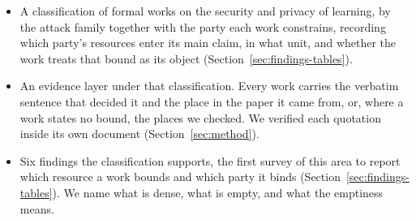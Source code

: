 \begin{itemize}
  \item A classification of \NumSources{} formal works on the security and
privacy of learning, by the attack family together with the party each work
constrains, recording which party's resources enter its main claim, in what
unit, and whether the work treats that bound as its object
(Section~\ref{sec:findings-tables}).
  \item An evidence layer under that classification. Every work carries the
verbatim sentence that decided it and the place in the paper it came from, or,
where a work states no bound, the places we checked. We verified each
quotation inside its own document (Section~\ref{sec:method}).
  \item Six findings the classification supports, the first survey of this area
to report which resource a work bounds and which party it binds
(Section~\ref{sec:findings-tables}). We name what is dense, what is empty, and
what the emptiness means.
\end{itemize}
